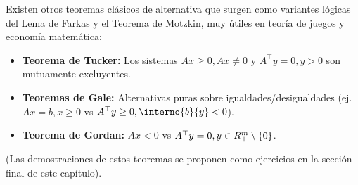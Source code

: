 \begin{notabox}
 Existen otros teoremas clásicos de alternativa que surgen como variantes lógicas del Lema de Farkas y el Teorema de Motzkin, muy útiles en teoría de juegos y economía matemática:
 \begin{itemize}
 \item \textbf{Teorema de Tucker:} Los sistemas $A x \ge 0, Ax \neq 0$ y $A^\top y = 0, y > 0$ son mutuamente excluyentes.
 \item \textbf{Teoremas de Gale:} Alternativas puras sobre igualdades/desigualdades (ej. $Ax = b, x \ge 0$ vs $A^\top y \ge 0, \interno{b}{y} < 0$).
 \item \textbf{Teorema de Gordan:} $Ax < 0$ vs $A^\top y = 0, y \in R^m_+ \setminus \{0\}$.
 \end{itemize}
 (Las demostraciones de estos teoremas se proponen como ejercicios en la sección final de este capítulo).
\end{notabox}